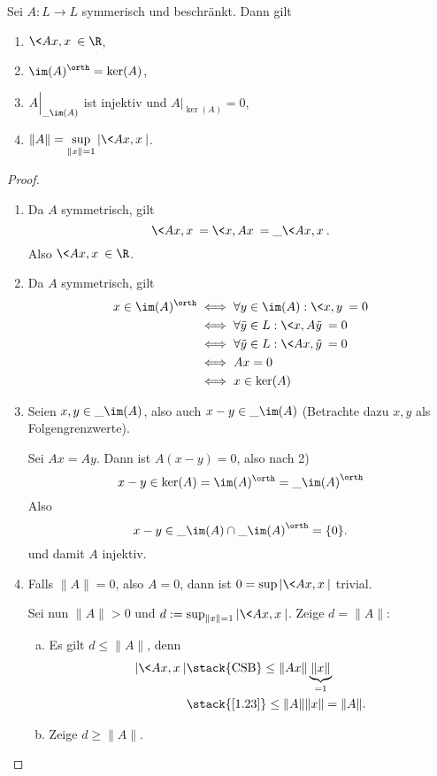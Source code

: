 \begin{st} \label{3.3}
	Sei $A: L \to L$ symmerisch und beschränkt.
	Dann gilt
	\begin{enumerate}[1)]
		\item
			$\displaystyle \<Ax,x\> \in \R$,
		\item
			$\displaystyle \im(A)^\orth = \ker(A)$,
		\item
			$\displaystyle A \Big|_{\_{\im (A)} }$ ist injektiv und $A \Big|_{\ker(A)} = 0$,
		\item
			$\displaystyle \|A\| = \sup_{\|x\|=1} |\<Ax,x\>|$.
	\end{enumerate}
	\begin{proof}
		\begin{enumerate}[1)]
			\item
				Da $A$ symmetrisch, gilt
				\[
					\<Ax, x\> = \<x, Ax\> = \_{\<Ax,x\>}.
				\]
				Also $\<Ax, x\> \in \R$.
			\item
				Da $A$ symmetrisch, gilt
				\begin{align*}
					x \in \im(A)^\orth
					& \iff \forall y \in \im(A) : \<x,y\> = 0 \\
					& \iff \forall \tilde y \in L: \<x, A\tilde y\> = 0 \\
					& \iff \forall \tilde y \in L: \<Ax,\tilde y\> = 0 \\
					& \iff Ax = 0 \\
					& \iff x \in \ker(A)
				\end{align*}
			\item
				Seien $x,y \in \_{\im(A)}$, also auch $x-y \in \_{\im(A)}$ (Betrachte dazu $x,y$ als Folgengrenzwerte).

				Sei $Ax = Ay$.
				Dann ist $A(x-y) = 0$, also nach 2)
				\[
					x-y \in \ker (A) = \im(A)^\orth = \_{\im(A)}^\orth
				\]
				Also 
				\[
					x-y \in \_{\im(A)} \cap \_{\im(A)}^\orth = \{0\}.
				\]
				und damit $A$ injektiv.
			\item
				Falls $\|A\| = 0$, also $A=0$, dann ist $0 = \sup |\<Ax,x\>|$ trivial.

				Sei nun $\|A\| > 0$ und $d := \sup_{\|x\|=1} |\<Ax,x\>|$.
				Zeige $d = \|A\|$:
				\begin{enumerate}[a)]
					\item
						Es gilt $d \le \|A\|$, denn
						\begin{align*}
							|\<Ax,x\>| 
							&\stack{\text{CSB}} \le \|Ax\| \underbrace{\|x\|}_{=1} \\
							&\stack{\ref{1.23}}\le \|A\| \|x\|
							= \|A\|.
						\end{align*}
					\item
						Zeige $d \ge \|A\|$.


\end{enumerate}
\end{enumerate}
\end{proof}
\end{st}
